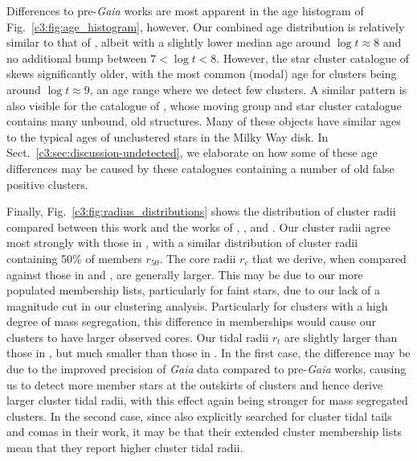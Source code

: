 Differences to pre-\emph{Gaia} works are most apparent in the age histogram of Fig.~\ref{c3:fig:age_histogram}, however. Our combined age distribution is relatively similar to that of \cite{cantat-gaudin_painting_2020}, albeit with a slightly lower median age around $\log t \approx 8$ and no additional bump between $7 < \log t < 8$. However, the star cluster catalogue of \cite{kharchenko_global_2013} skews significantly older, with the most common (modal) age for clusters being around $\log t \approx 9$, an age range where we detect few clusters. A similar pattern is also visible for the catalogue of \cite{kounkel_untangling_2020}, whose moving group and star cluster catalogue contains many unbound, old structures. Many of these objects have similar ages to the typical ages of unclustered stars in the Milky Way disk. In Sect.~\ref{c3:sec:discussion-undetected}, we elaborate on how some of these age differences may be caused by these catalogues containing a number of old false positive clusters. 

Finally, Fig.~\ref{c3:fig:radius_distributions} shows the distribution of cluster radii compared between this work and the works of \cite{kharchenko_global_2013}, \cite{tarricq_structural_2022}, and \cite{cantat-gaudin_clusters_2020}. Our cluster radii agree most strongly with those in \cite{cantat-gaudin_clusters_2020}, with a similar distribution of cluster radii containing 50\% of members $r_{50}$. The \cite{king_structure_star_1962} core radii $r_c$ that we derive, when compared against those in \cite{kharchenko_global_2013} and \cite{tarricq_structural_2022}, are generally larger. This may be due to our more populated membership lists, particularly for faint stars, due to our lack of a magnitude cut in our clustering analysis. Particularly for clusters with a high degree of mass segregation, this difference in memberships would cause our clusters to have larger observed cores. Our tidal radii $r_t$ are slightly larger than those in \cite{kharchenko_global_2013}, but much smaller than those in \cite{tarricq_structural_2022}. In the first case, the difference may be due to the improved precision of \emph{Gaia} data compared to pre-\emph{Gaia} works, causing us to detect more member stars at the outskirts of clusters and hence derive larger cluster tidal radii, with this effect again being stronger for mass segregated clusters. In the second case, since \cite{tarricq_structural_2022} also explicitly searched for cluster tidal tails and comas in their work, it may be that their extended cluster membership lists mean that they report higher cluster tidal radii.

